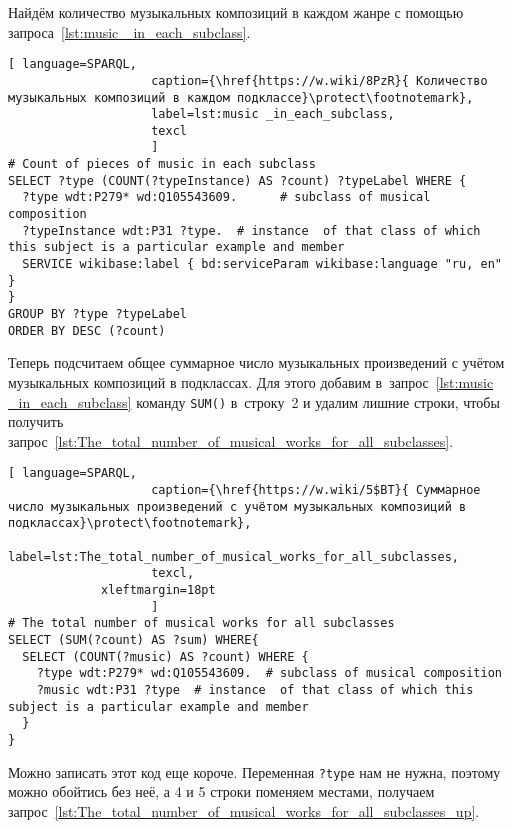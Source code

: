 Найдём количество музыкальных композиций в каждом жанре с помощью запроса~\ref{lst:music _in_each_subclass}.

\begin{lstlisting}[ language=SPARQL,
                    caption={\href{https://w.wiki/8PzR}{ Количество музыкальных композиций в каждом подклассе}\protect\footnotemark},
                    label=lst:music _in_each_subclass,
                    texcl
                    ]
# Count of pieces of music in each subclass
SELECT ?type (COUNT(?typeInstance) AS ?count) ?typeLabel WHERE {
  ?type wdt:P279* wd:Q105543609.      # subclass of musical composition
  ?typeInstance wdt:P31 ?type.  # instance  of that class of which this subject is a particular example and member
  SERVICE wikibase:label { bd:serviceParam wikibase:language "ru, en" }
}
GROUP BY ?type ?typeLabel
ORDER BY DESC (?count)
\end{lstlisting}%

Теперь подсчитаем общее суммарное число музыкальных произведений с учётом музыкальных композиций в подклассах. Для этого добавим в~запрос~\ref{lst:music _in_each_subclass} команду \lstinline|SUM()| в~строку~2 и удалим лишние строки, чтобы получить запрос~\ref{lst:The_total_number_of_musical_works_for_all_subclasses}.

\begin{lstlisting}[ language=SPARQL,
                    caption={\href{https://w.wiki/5$BT}{ Суммарное число музыкальных произведений с учётом музыкальных композиций в подклассах}\protect\footnotemark},
                    label=lst:The_total_number_of_musical_works_for_all_subclasses,
                    texcl,
	         xleftmargin=18pt
                    ]
# The total number of musical works for all subclasses 
SELECT (SUM(?count) AS ?sum) WHERE{
  SELECT (COUNT(?music) AS ?count) WHERE {
    ?type wdt:P279* wd:Q105543609.  # subclass of musical composition
    ?music wdt:P31 ?type  # instance  of that class of which this subject is a particular example and member
  }
}
\end{lstlisting}%

Можно записать этот код еще короче. Переменная \lstinline|?type| нам не нужна, поэтому можно обойтись без неё, а 4 и 5 строки поменяем местами, получаем запрос~\ref{lst:The_total_number_of_musical_works_for_all_subclasses_up}.

